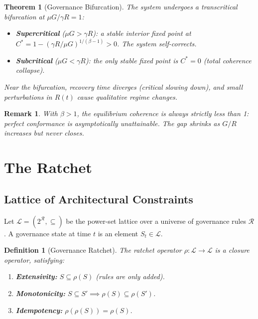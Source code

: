 \documentclass[11pt, a4paper, copyright]{googledeepmind}
\newtheorem{definition}{Definition}[section]
\newtheorem{theorem}{Theorem}[section]
\newtheorem*{remark}{Remark}
\begin{document}
\begin{theorem}[Governance Bifurcation]
\label{thm:bifurcation}
The system undergoes a transcritical bifurcation at $\mu G / \gamma R = 1$:
\begin{itemize}
    \item \textbf{Supercritical} ($\mu G > \gamma R$): a stable interior fixed point at $C^* = 1 - (\gamma R / \mu G)^{1/(\beta-1)} > 0$. The system self-corrects.
    \item \textbf{Subcritical} ($\mu G < \gamma R$): the only stable fixed point is $C^* = 0$ (total coherence collapse).
\end{itemize}
Near the bifurcation, recovery time diverges (critical slowing down), and small perturbations in $R(t)$ cause qualitative regime changes.
\end{theorem}

\begin{remark}
With $\beta > 1$, the equilibrium coherence is always strictly less than 1: perfect conformance is asymptotically unattainable. The gap shrinks as $G/R$ increases but never closes.
\end{remark}


\section{The Ratchet}
\label{sec:ratchet}

\subsection{Lattice of Architectural Constraints}

Let $\mathcal{L} = (2^{\mathcal{R}}, \subseteq)$ be the power-set lattice over a universe of governance rules $\mathcal{R}$. A governance state at time $t$ is an element $S_t \in \mathcal{L}$.

\begin{definition}[Governance Ratchet]
\label{def:ratchet}
The ratchet operator $\rho: \mathcal{L} \to \mathcal{L}$ is a \emph{closure operator}, satisfying:
\begin{enumerate}
    \item \textbf{Extensivity:} $S \subseteq \rho(S)$ (rules are only added).
    \item \textbf{Monotonicity:} $S \subseteq S' \implies \rho(S) \subseteq \rho(S')$.
    \item \textbf{Idempotency:} $\rho(\rho(S)) = \rho(S)$.
\end{enumerate}
\end{definition}
\end{document}
